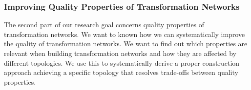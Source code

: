 




\subsubsection*{Improving Quality Properties of Transformation Networks}

The second part of our research goal concerns quality properties of transformation networks.
We want to known how we can systematically improve the quality of transformation networks. We want to find out which properties are relevant when building transformation networks and how they are affected by different topologies. 
We use this to systematically derive a proper construction approach achieving a specific topology that resolves trade-offs between quality properties. 

